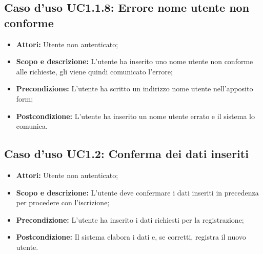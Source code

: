 \subsection{Caso d'uso UC1.1.8: Errore nome utente non conforme}
\begin{itemize}
	\item \textbf{Attori:} Utente non autenticato;
	\item \textbf{Scopo e descrizione:} L'utente ha inserito uno nome utente non conforme alle richieste, gli viene quindi comunicato l'errore;
	\item \textbf{Precondizione:} L'utente ha scritto un indirizzo nome utente nell'apposito form;
	\item \textbf{Postcondizione:} L'utente ha inserito un nome utente errato e il sistema lo comunica.
\end{itemize}


\subsection{Caso d'uso UC1.2: Conferma dei dati inseriti}
\begin{itemize}
	\item \textbf{Attori:} Utente non autenticato;
	\item \textbf{Scopo e descrizione:} L'utente deve confermare i dati inseriti in precedenza per procedere con l'iscrizione;
	\item \textbf{Precondizione:} L'utente ha inserito i dati richiesti per la registrazione;
	\item \textbf{Postcondizione:} Il sistema elabora i dati e, se corretti, registra il nuovo utente.
\end{itemize}
